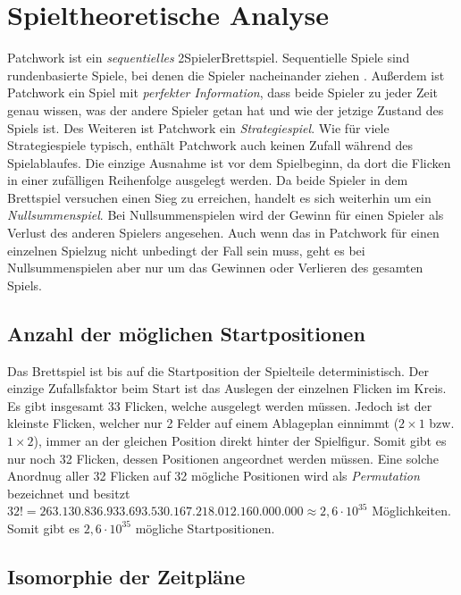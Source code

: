 \section{Spieltheoretische Analyse}

Patchwork ist ein \emph{sequentielles} 2\textendash{}Spieler\textendash{}Brettspiel. Sequentielle Spiele sind rundenbasierte Spiele, bei denen die Spieler nacheinander ziehen \cite[S. 53]{2014.GameTheoryThroughExamples}. Außerdem ist Patchwork ein Spiel mit \emph{perfekter Information}, \dash dass beide Spieler zu jeder Zeit genau wissen, was der andere Spieler getan hat und wie der jetzige Zustand des Spiels ist. Des Weiteren ist Patchwork ein \emph{Strategiespiel}. Wie für viele Strategiespiele typisch, enthält Patchwork auch keinen Zufall während des Spielablaufes. Die einzige Ausnahme ist vor dem Spielbeginn, da dort die Flicken in einer zufälligen Reihenfolge ausgelegt werden. Da beide Spieler in dem Brettspiel versuchen einen Sieg zu erreichen, handelt es sich weiterhin um ein \emph{Nullsummenspiel}. Bei Nullsummenspielen wird der Gewinn für einen Spieler als Verlust des anderen Spielers angesehen. Auch wenn das in Patchwork für einen einzelnen Spielzug nicht unbedingt der Fall sein muss, geht es bei Nullsummenspielen aber nur um das Gewinnen oder Verlieren des gesamten Spiels.

\subsection*{Anzahl der möglichen Startpositionen}

Das Brettspiel ist bis auf die Startposition der Spielteile deterministisch. Der einzige Zufallsfaktor beim Start ist das Auslegen der einzelnen Flicken im Kreis. Es gibt insgesamt 33 Flicken, welche ausgelegt werden müssen. Jedoch ist der kleinste Flicken, welcher nur 2 Felder auf einem Ablageplan einnimmt ($2\times1$ bzw. $1\times2$), immer an der gleichen Position direkt hinter der Spielfigur. Somit gibt es nur noch 32 Flicken, dessen Positionen angeordnet werden müssen. Eine solche Anordnug aller 32 Flicken auf 32 mögliche Positionen wird als \emph{Permutation} bezeichnet und besitzt $32! = 263.130.836.933.693.530.167.218.012.160.000.000 \approx 2,6 \cdot 10^{35}$ Möglichkeiten. Somit gibt es $2,6 \cdot 10^{35}$ mögliche Startpositionen.

\subsection*{Isomorphie der Zeitpläne}

